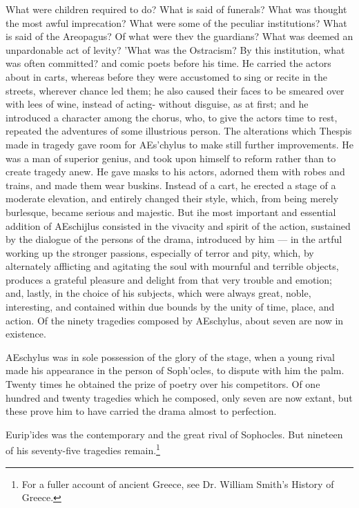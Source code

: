 \documentclass[openany,a4paper]{memoir}
\begin{document}
What were children required to do? What is said of funerals? 
What was thought the most awful imprecation? What were some of 
the peculiar institutions? What is said of the Areopagus? Of what 
were thev the guardians? What was deemed an unpardonable act of 
levity? 'What was the Ostracism? By this institution, what was often 
committed? 
and comic poets before his time. He carried the actors 
about in carts, whereas before they were accustomed to sing 
or recite in the streets, wherever chance led them; he also 
caused their faces to be smeared over with lees of wine, instead of acting- without disguise, as at first; and he introduced a character among the chorus, who, to give the actors 
time to rest, repeated the adventures of some illustrious 
person. The alterations which Thespis made in tragedy 
gave room for AEs'chylus to make still further improvements. He was a man of superior genius, and took upon 
himself to reform rather than to create tragedy anew. He 
gave masks to his actors, adorned them with robes and 
trains, and made them wear buskins. Instead of a cart, he 
erected a stage of a moderate elevation, and entirely changed 
their style, which, from being merely burlesque, became 
serious and majestic. But ihe most important and essential 
addition of AEschijlus consisted in the vivacity and spirit of 
the action, sustained by the dialogue of the persons of the 
drama, introduced by him — in the artful working up the 
stronger passions, especially of terror and pity, which, by 
alternately afflicting and agitating the soul with mournful 
and terrible objects, produces a grateful pleasure and delight 
from that very trouble and emotion; and, lastly, in the 
choice of his subjects, which were always great, noble, interesting, and contained within due bounds by the unity of 
time, place, and action. Of the ninety tragedies composed 
by AEschylus, about seven are now in existence. 

AEschylus was in sole possession of the glory of the stage, 
when a young rival made his appearance in the person of 
Soph'ocles, to dispute with him the palm. Twenty times he 
obtained the prize of poetry over his competitors. Of one 
hundred and twenty tragedies which he composed, only seven 
are now extant, but these prove him to have carried the drama 
almost to perfection. 

Eurip'ides was the contemporary and the great rival of 
Sophocles. But nineteen of his seventy-five tragedies remain.\footnote{For a fuller account of ancient Greece, see Dr. William Smith's 
History of Greece.}
\end{document}
